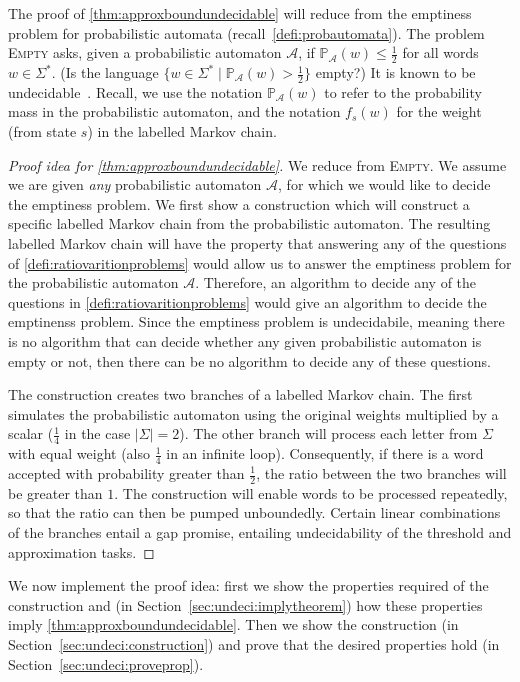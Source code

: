\documentclass{lmcs}
\theoremstyle{plain}
\theoremstyle{definition}
\theoremstyle{remark}
\newcommand\pr{\mathbb{P}}
\renewcommand\nu{f}
\begin{document}
\noindent The proof of \cref{thm:approxboundundecidable} will reduce from the emptiness problem for probabilistic automata (recall~\cref{defi:probautomata}). The problem \textsc{Empty} asks, given a probabilistic automaton $\mathcal{A}$,
if $\pr_\mathcal{A}(w) \le \frac{1}{2}$ for all words $w \in \Sigma^*$. (Is the language $\{w\in \Sigma^* \mid \pr_\mathcal{A}(w) > \frac{1}{2}\}$ empty?)
It is known to be undecidable~\cite{paz2014introduction,fijalkow2017undecidability}.   Recall, we use the notation $\pr_\mathcal{A}(w)$ to refer to the probability mass in the probabilistic automaton, and the notation $\nu_s(w)$ for the weight (from state $s$) in the labelled Markov chain.

\begin{proof}[Proof idea for \cref{thm:approxboundundecidable}] We reduce from \textsc{Empty}.
We assume we are given \emph{any} probabilistic automaton $\mathcal{A}$, for which we would like to decide the emptiness problem.
We first show a construction which will construct a specific labelled Markov chain from the probabilistic automaton.
The resulting labelled Markov chain will have the property that answering any of the questions of \cref{defi:ratiovaritionproblems} would allow us to answer the emptiness problem for the probabilistic automaton $\mathcal{A}$.
Therefore, an algorithm to decide any of the questions in \cref{defi:ratiovaritionproblems} would give an algorithm to decide the emptinenss problem.
Since the emptiness problem is undecidabile, meaning there is no algorithm that can decide whether any given probabilistic automaton is empty or not, then there can be no algorithm to decide any of these questions.

The construction creates two branches of a labelled Markov chain.
The first simulates the probabilistic automaton using the original weights multiplied by a scalar ($\frac{1}{4}$ in the case $|\Sigma| = 2$).
The other branch will process each letter from $\Sigma$ with equal weight (also $\frac{1}{4}$ in an infinite loop). Consequently,
 if there is a word accepted with probability greater than $\frac{1}{2}$, the ratio between the two branches will be greater than $1$.
 The construction will enable words to be processed repeatedly, so that the ratio can then be pumped unboundedly. Certain linear combinations of the branches entail a gap promise, entailing undecidability of the threshold and approximation tasks.
\end{proof}

We now implement the proof idea: first we show the properties required of the construction and (in Section~\ref{sec:undeci:implytheorem}) how these properties imply \cref{thm:approxboundundecidable}. Then we show the construction (in Section~\ref{sec:undeci:construction}) and prove that the desired properties hold (in Section~\ref{sec:undeci:proveprop}).
\end{document}
